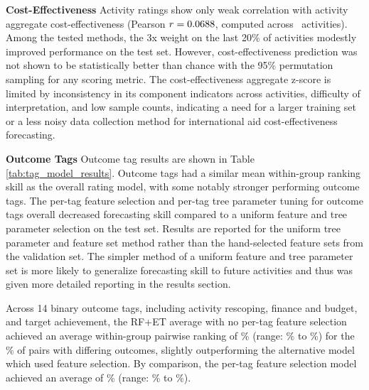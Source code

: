 \documentclass[12pt,a4paper]{article}
\begin{document}
\textbf{Cost-Effectiveness}
Activity ratings show only weak correlation with activity aggregate cost-effectiveness (Pearson $r = 0.0688$, computed across \NCostEffectiveness\ activities). Among the tested methods, the 3x weight on the last 20\% of activities modestly improved performance on the test set. However, cost-effectiveness prediction was not shown to be statistically better than chance with the 95\% permutation sampling for any scoring metric. The cost-effectiveness aggregate z-score is limited by inconsistency in its component indicators across activities, difficulty of interpretation, and low sample counts, indicating a need for a larger training set or a less noisy data collection method for international aid cost-effectiveness forecasting. 

\textbf{Outcome Tags}
Outcome tag results are shown in Table \ref{tab:tag_model_results}. Outcome tags had a similar mean within-group ranking skill as the overall rating model, with some notably stronger performing outcome tags. The per-tag feature selection and per-tag tree parameter tuning for outcome tags overall decreased forecasting skill compared to a uniform feature and tree parameter selection on the test set. Results are reported for the uniform tree parameter and feature set method rather than the hand-selected feature sets from the validation set. The simpler method of a uniform feature and tree parameter set is more likely to generalize forecasting skill to future activities and thus was given more detailed reporting in the results section.

Across 14 binary outcome tags, including activity rescoping, finance and budget, and target achievement, the RF+ET average with no per-tag feature selection  achieved an average within-group pairwise ranking of \OutcomeTagPairwiseAvgNolimits\% (range: \OutcomeTagPairwiseMinNolimits\% to \OutcomeTagPairwiseMaxNolimits\%) for the \DifferingOutcomePairsFrac\% of pairs with differing outcomes, slightly outperforming the alternative model which used feature selection. By comparison, the per-tag feature selection model achieved an average of \OutcomeTagPairwiseAvgFeatSel\% (range: \OutcomeTagPairwiseMinFeatSel\% to \OutcomeTagPairwiseMaxFeatSel\%).



\FloatBarrier
\end{document}

